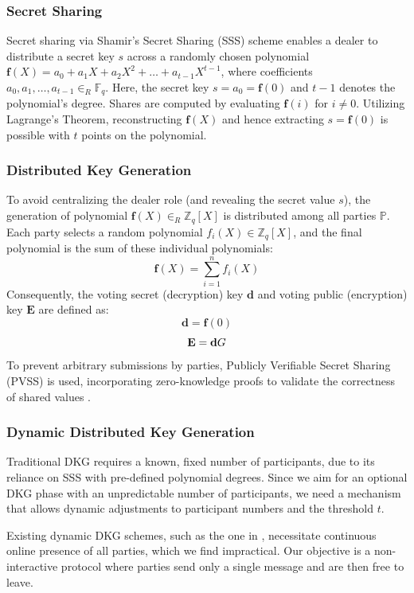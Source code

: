 \documentclass[runningheads]{llncs}
\begin{document}
\subsubsection*{Secret Sharing}
Secret sharing via Shamir's Secret Sharing (SSS) scheme enables a dealer to distribute a secret key $s$ across a randomly chosen polynomial $\mathbf{f}(X) = a_0 + a_1X + a_2X^2 + \dots + a_{t-1}X^{t-1}$, where coefficients $a_0,a_1,\dots,a_{t-1} \in_R \mathbb{F}_q$. Here, the secret key $s=a_0=\mathbf{f}(0)$ and $t-1$ denotes the polynomial's degree. Shares are computed by evaluating $\mathbf{f}(i)$ for $i \neq 0$. Utilizing Lagrange's Theorem, reconstructing $\mathbf{f}(X)$ and hence extracting $s = \mathbf{f}(0)$ is possible with $t$ points on the polynomial.

\subsubsection*{Distributed Key Generation}
To avoid centralizing the dealer role (and revealing the secret value $s$), the generation of polynomial $\mathbf{f}(X) \in_R \mathbb{Z}_q[X]$ is distributed among all parties $\mathbb{P}$. Each party selects a random polynomial $f_{i}(X) \in \mathbb{Z}_q[X]$, and the final polynomial is the sum of these individual polynomials: \[\mathbf{f}(X)=\sum_{i=1}^{n}f_i(X)\] Consequently, the voting secret (decryption) key $\mathbf{d}$ and voting public (encryption) key $\mathbf{E}$ are defined as: $$\mathbf{d}=\mathbf{f}(0)$$ $$\mathbf{E}=\mathbf{d} G$$ 
To prevent arbitrary submissions by parties, Publicly Verifiable Secret Sharing (PVSS) is used, incorporating zero-knowledge proofs to validate the correctness of shared values \cite{goosSimplePubliclyVerifiable1999}.

\subsubsection*{Dynamic Distributed Key Generation}
Traditional DKG requires a known, fixed number of participants, due to its reliance on SSS with pre-defined polynomial degrees. Since we aim for an optional DKG phase with an unpredictable number of participants, we need a mechanism that allows dynamic adjustments to participant numbers and the threshold $t$.

Existing dynamic DKG schemes, such as the one in \cite{delerableeDynamicThresholdPublickey2008}, necessitate continuous online presence of all parties, which we find impractical. Our objective is a non-interactive protocol where parties send only a single message and are then free to leave.
\end{document}
